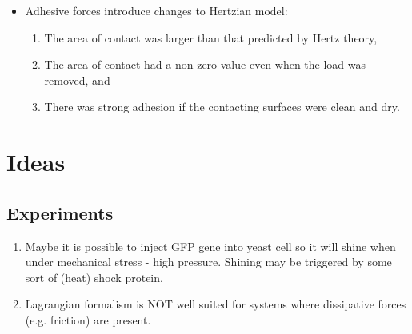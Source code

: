 \documentclass[10pt,a4paper]{article}
\begin{document}
\begin{itemize}
 \item Adhesive forces introduce changes to Hertzian model:
 \begin{enumerate}
  \item The area of contact was larger than that predicted by Hertz theory,
  \item The area of contact had a non-zero value even when the load was removed, and
  \item There was strong adhesion if the contacting surfaces were clean and dry.

 \end{enumerate}



\end{itemize}



\section{Ideas}
\subsection{Experiments}
\begin{enumerate}
 \item Maybe it is possible to inject GFP gene into yeast cell so it will shine when under mechanical stress - high pressure. 
 Shining may be triggered by some sort of (heat) shock protein.
 \item Lagrangian formalism is NOT well suited for systems where dissipative forces (e.g. friction) are present.
\end{enumerate}
\end{document}
